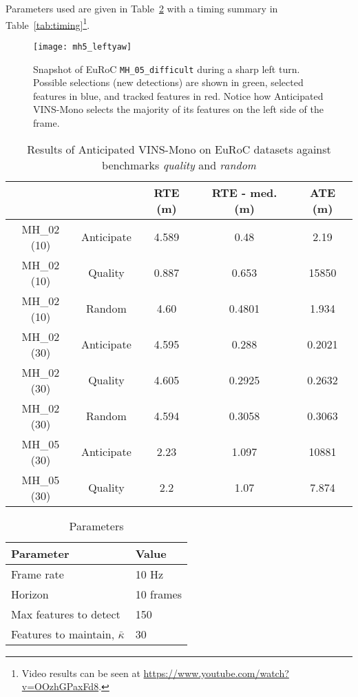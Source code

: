 Parameters used are given in Table~\ref{tab:parameters} with a timing summary in Table~\ref{tab:timing}\footnote{Video results can be seen at \url{https://www.youtube.com/watch?v=OOzhGPaxFd8}.}.

\begin{figure}
\centering
\texttt{[image: mh5\_leftyaw]} 
\caption{Snapshot of EuRoC \texttt{MH\_05\_difficult} during a sharp left turn. Possible selections (new detections) are shown in green, selected features in blue, and tracked features in red. Notice how Anticipated VINS-Mono selects the majority of its features on the left side of the frame.}
\label{fig:architecture} 
\end{figure}

\begin{table}[h]
\centering
\caption{Results of Anticipated VINS-Mono on EuRoC datasets against benchmarks \textit{quality} and \textit{random}}
\begin{tabular}{*{5}{c}}
    \toprule
     &  & RTE (m) & RTE - med. (m) & ATE (m) \\
    \midrule
    MH\_02 (10) & Anticipate & 4.589 & 0.48 & 2.19 \\ 
    MH\_02 (10) & Quality & 0.887 & 0.653 &15850 \\ 
    MH\_02 (10) & Random & 4.60 & 0.4801 & 1.934 \\ 
    \midrule
    MH\_02 (30) & Anticipate & 4.595 & 0.288 & 0.2021 \\ 
    MH\_02 (30) & Quality & 4.605 & 0.2925 & 0.2632 \\ 
    MH\_02 (30) & Random & 4.594 & 0.3058 & 0.3063 \\ 
    \midrule
    MH\_05 (30) & Anticipate & 2.23 & 1.097 & 10881 \\ 
    MH\_05 (30) & Quality & 2.2 & 1.07 & 7.874\\ 
    \bottomrule
\end{tabular}
\label{tab:results}
\end{table}

\begin{table}[h]
\centering
\caption{Parameters}
\begin{tabular}{ll}
    \toprule
    Parameter & Value \\
    \midrule
    Frame rate & 10 Hz \\
    Horizon & 10 frames \\
    Max features to detect & 150 \\
    Features to maintain, $\bar{\kappa}$ & 30 \\
    \bottomrule
\end{tabular}
\label{tab:parameters}
\end{table}

